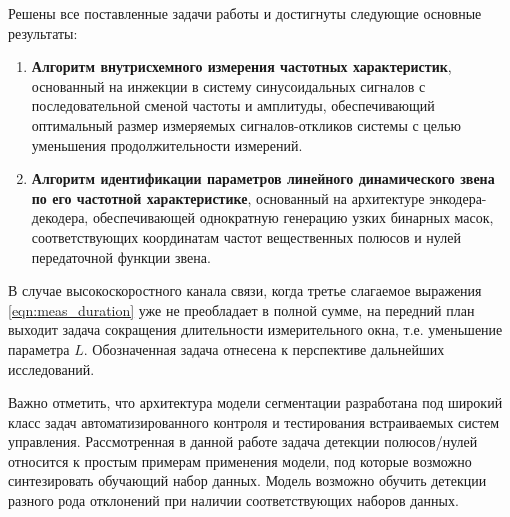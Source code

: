 
Решены все поставленные задачи работы и достигнуты следующие основные результаты:
\begin{enumerate}
    \item \textbf{Алгоритм внутрисхемного измерения частотных характеристик}, основанный на инжекции в систему синусоидальных сигналов с последовательной сменой частоты и амплитуды, обеспечивающий оптимальный размер измеряемых сигналов-откликов системы с целью уменьшения продолжительности измерений.

    \item \textbf{Алгоритм идентификации параметров линейного динамического звена по его частотной характеристике}, основанный на архитектуре энкодера-декодера, обеспечивающей однократную генерацию узких бинарных масок, соответствующих координатам частот вещественных полюсов и нулей передаточной функции звена.
\end{enumerate}

В случае высокоскоростного канала связи, когда третье слагаемое выражения \eqref{eqn:meas_duration} уже не преобладает в полной сумме, на передний план выходит задача сокращения длительности измерительного окна, т.е. уменьшение параметра $L$. Обозначенная задача отнесена к перспективе дальнейших исследований.

Важно отметить, что архитектура модели сегментации разработана под широкий класс задач автоматизированного контроля и тестирования встраиваемых систем управления. Рассмотренная в данной работе задача детекции полюсов/нулей относится к простым примерам применения модели, под которые возможно синтезировать обучающий набор данных. Модель возможно обучить детекции разного рода отклонений при наличии соответствующих наборов данных.